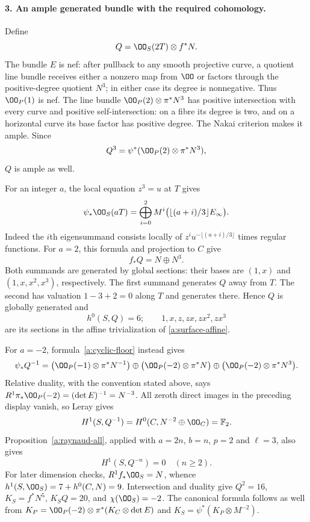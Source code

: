 \paragraph{3. An ample generated bundle with the required cohomology.}
Define
\[
 Q=\OO_S(2T)\otimes f^*N.
\]
The bundle $E$ is nef: after pullback to any smooth projective curve,
a quotient line bundle receives either a nonzero map from $\OO$ or
factors through the positive-degree quotient $N^3$; in either case
its degree is nonnegative. Thus $\OO_P(1)$ is nef. The line bundle
$\OO_P(2)\otimes\pi^*N^3$ has positive intersection with every
curve and positive self-intersection: on a fibre its degree is two,
and on a horizontal curve its base factor has positive degree.
The Nakai criterion makes it ample. Since
\[
 Q^3=\psi^*(\OO_P(2)\otimes\pi^*N^3),
\]
$Q$ is ample as well.

For an integer $a$, the local equation $z^3=u$ at $T$ gives
\begin{equation}\label{a:cyclic-floor}
 \psi_*\OO_S(aT)=
 \bigoplus_{i=0}^2 M^i\bigl(\lfloor(a+i)/3\rfloor E_\infty\bigr).
\end{equation}
Indeed the $i$th eigensummand consists locally of
$z^i u^{-\lfloor(a+i)/3\rfloor}$ times regular functions.
For $a=2$, this formula and projection to $C$ give
\[
 f_*Q=N\oplus N^3.
\]
Both summands are generated by global sections: their bases are
$(1,x)$ and $(1,x,x^2,x^3)$, respectively. The first summand generates
$Q$ away from $T$. The second has valuation $1-3+2=0$ along $T$
and generates there. Hence $Q$ is globally generated and
\[
 h^0(S,Q)=6;\qquad
 1,x,z,zx,zx^2,zx^3
\]
are its sections in the affine trivialization of
\eqref{a:surface-affine}.

For $a=-2$, formula~\eqref{a:cyclic-floor} instead gives
\[
 \psi_*Q^{-1}=
 \bigl(\OO_P(-1)\otimes\pi^*N^{-1}\bigr)
 \oplus\bigl(\OO_P(-2)\otimes\pi^*N\bigr)
 \oplus\bigl(\OO_P(-2)\otimes\pi^*N^3\bigr).
\]
Relative duality, with the convention stated above, says
$R^1\pi_*\OO_P(-2)=(\det E)^{-1}=N^{-3}$.
All zeroth direct images in the preceding display vanish, so Leray
gives
\begin{equation}\label{a:Q-cohomology}
 H^1(S,Q^{-1})=H^0(C,N^{-2}\oplus\OO_C)=\mathbb F_2.
\end{equation}
Proposition~\ref{a:raynaud-all}, applied with $a=2n$, $b=n$,
$p=2$ and $\ell=3$, also gives
\[
 H^1(S,Q^{-n})=0\quad(n\geq2).
\]
For later dimension checks, $R^1f_*\OO_S=N$, whence
$h^1(S,\OO_S)=7+h^0(C,N)=9$. Intersection and duality give
$Q^2=16$, $K_S=f^*N^5$, $K_SQ=20$, and $\chi(\OO_S)=-2$.
The canonical formula follows as well from
$K_P=\OO_P(-2)\otimes\pi^*(K_C\otimes\det E)$ and
$K_S=\psi^*(K_P\otimes M^{-2})$.

